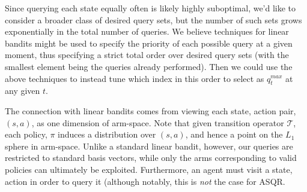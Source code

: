 \documentclass{article}
\begin{document}
Since querying each state equally often is likely highly suboptimal, we'd like to consider a broader class of desired query sets, but the number of such sets grows exponentially in the total number of queries.
We believe techniques for linear bandits might be used to specify the priority of each possible query at a given moment, thus specifying a strict total order over desired query sets (with the smallest element being the queries already performed).
Then we could use the above techniques to instead tune which index in this order to select as $q^{max}_t$ at any given $t$.

The connection with linear bandits comes from viewing each state, action pair, $(s,a)$, as one dimension of arm-space.
Note that given transition operator $\mathcal{T}$, each policy, $\pi$ induces a distribution over $(s,a)$, and hence a point on the $L_1$ sphere in arm-space.
Unlike a standard linear bandit, however, our queries are restricted to standard basis vectors, while only the arms corresponding to valid policies can ultimately be exploited.
Furthermore, an agent must visit a state, action in order to query it (although notably, this is \emph{not} the case for ASQR.







%

\end{document}
